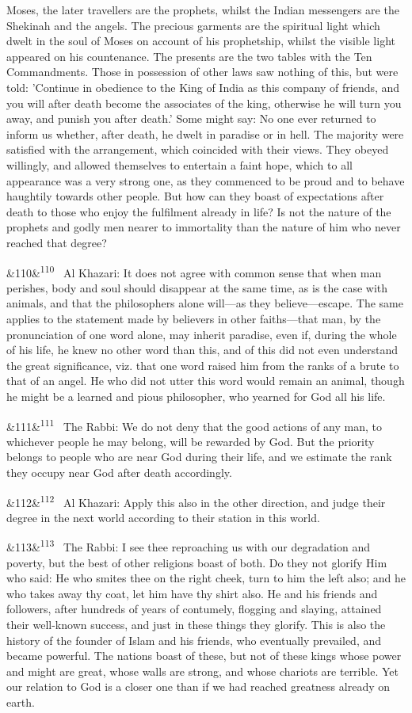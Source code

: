 \documentclass[12pt]{article}
\newcommand{\para}[1][]{\par\noindent\ifx&#1&\else\textsuperscript{\footnotesize #1}~\fi}
\begin{document}
Moses, the later travellers are the prophets, whilst the Indian messengers are the Shekinah and the angels. The precious garments are the spiritual light which dwelt in the soul of Moses on account of his prophetship, whilst the visible light appeared on his countenance. The presents are the two tables with the Ten Commandments. Those in possession of other laws saw nothing of this, but were told: 'Continue in obedience to the King of India as this company of friends, and you will after death become the associates of the king, otherwise he will turn you away, and punish you after death.' Some might say: No one ever returned to inform us whether, after death, he dwelt in paradise or in hell. The majority were satisfied with the arrangement, which coincided with their views. They obeyed willingly, and allowed themselves to entertain a faint hope, which to all appearance was a very strong one, as they commenced to be proud and to behave haughtily towards other people. But how can they boast of expectations after death to those who enjoy the fulfilment already in life? Is not the nature of the prophets and godly men nearer to immortality than the nature of him who never reached that degree?

\para[110] Al Khazari: It does not agree with common sense that when man perishes, body and soul should disappear at the same time, as is the case with animals, and that the philosophers alone will---as they believe---escape. The same applies to the statement made by believers in other faiths---that man, by the pronunciation of one word alone, may inherit paradise, even if, during the whole of his life, he knew no other word than this, and of this did not even understand the great significance, viz. that one word raised him from the ranks of a brute to that of an angel. He who did not utter this word would remain an animal, though he might be a learned and pious philosopher, who yearned for God all his life.

\para[111] The Rabbi: We do not deny that the good actions of any man, to whichever people he may belong, will be rewarded by God. But the priority belongs to people who are near God during their life, and we estimate the rank they occupy near God after death accordingly.

\para[112] Al Khazari: Apply this also in the other direction, and judge their degree in the next world according to their station in this world.

\para[113] The Rabbi: I see thee reproaching us with our degradation and poverty, but the best of other religions boast of both. Do they not glorify Him who said: He who smites thee on the right cheek, turn to him the left also; and he who takes away thy coat, let him have thy shirt also. He and his friends and followers, after hundreds of years of contumely, flogging and slaying, attained their well-known success, and just in these things they glorify. This is also the history of the founder of Islam and his friends, who eventually prevailed, and became powerful. The nations boast of these, but not of these kings whose power and might are great, whose walls are strong, and whose chariots are terrible. Yet our relation to God is a closer one than if we had reached greatness already on earth.
\end{document}
